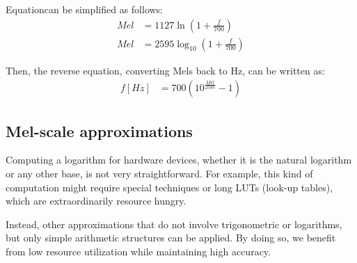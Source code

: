 Equation\;[\ref{eq:mel_1}] can be simplified as follows:
\begin{align}
    Mel & = 1127 \ln \left( 1 + \frac{f}{700} \right) \nonumber \\
    Mel & = 2595 \log_{10}\left( 1 + \frac{f}{700} \right)
\end{align}

\bigskip
\bigskip
\bigskip
\bigskip
\bigskip
\bigskip
Then, the reverse equation, converting Mels back to Hz,
can be written as:
\begin{align}
    f[Hz] & = 700 \left( 10^{\frac{Mel}{2595}} -1  \right)
\end{align}


\subsection{Mel-scale approximations}
Computing a logarithm for hardware devices, 
whether it is the natural logarithm or any other base, 
is not very straightforward.
For example, this kind of computation might require special
techniques or long LUTs (look-up tables),
which are extraordinarily resource hungry.

Instead, other approximations that do not involve
trigonometric or logarithms, but only
simple arithmetic structures can be applied.
By doing so, we benefit from low resource
utilization while maintaining high accuracy.

